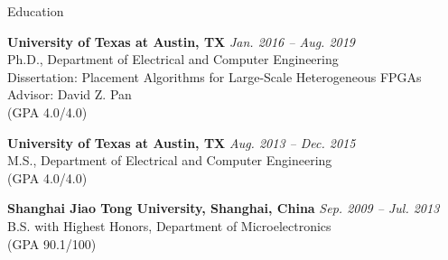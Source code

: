 

\begin{rSection}{Education}


{\bf University of Texas at Austin, TX} \hfill {\em Jan. 2016 -- Aug. 2019} \\ 
Ph.D., Department of Electrical and Computer Engineering \\
Dissertation: Placement Algorithms for Large-Scale Heterogeneous FPGAs \\
Advisor: David Z. Pan \\
(GPA 4.0/4.0) 

{\bf University of Texas at Austin, TX} \hfill {\em Aug. 2013 -- Dec. 2015} \\ 
M.S., Department of Electrical and Computer Engineering \\
(GPA 4.0/4.0) 

{\bf Shanghai Jiao Tong University, Shanghai, China} \hfill {\em Sep. 2009 -- Jul. 2013} \\ 
B.S. with Highest Honors, Department of Microelectronics \\
(GPA 90.1/100)

\end{rSection}


